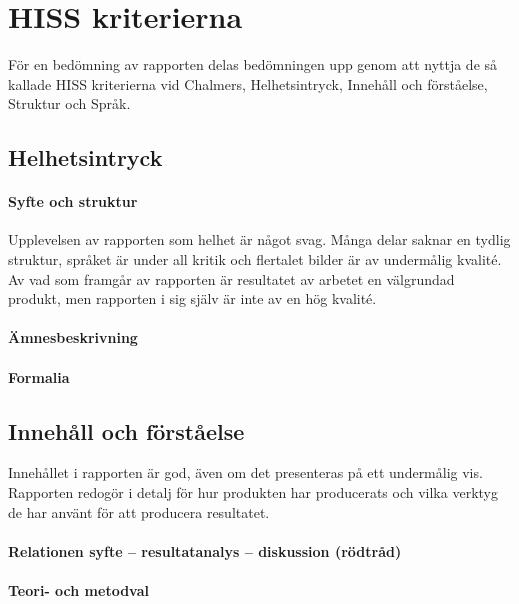 \section{HISS kriterierna} %
\label{sec:hiss}
    För en bedömning av rapporten delas bedömningen upp genom att nyttja de så kallade HISS kriterierna vid Chalmers, Helhetsintryck, Innehåll och förståelse, Struktur och Språk.

    \subsection{Helhetsintryck} %
    \label{sub:helhetsintryck}
    \paragraph{Syfte och struktur}
        Upplevelsen av rapporten som helhet är något svag. Många delar saknar en tydlig struktur, språket är under all kritik och flertalet bilder är av undermålig kvalité. Av vad som framgår av rapporten är resultatet av arbetet en välgrundad produkt, men rapporten i sig själv är inte av en hög kvalité.

    \paragraph{Ämnesbeskrivning}

    \paragraph{Formalia}


    \subsection{Innehåll och förståelse} %
    \label{sub:innehall}
    Innehållet i rapporten är god, även om det presenteras på ett undermålig vis. Rapporten redogör i detalj för hur produkten har producerats och vilka verktyg de har använt för att producera resultatet.
    \paragraph{Relationen syfte – resultatanalys – diskussion (rödtråd)}

    \paragraph{Teori- och metodval}

